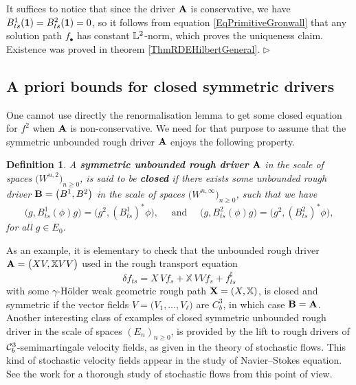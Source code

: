 \documentclass[11pt,a4paper]{amsart}
\newcommand{\bbX}{\mathbb{X}}
\renewcommand{\geq}{\geqslant}
\newcommand{\ssk}{\smallskip}
\newtheorem{defn}[thm]{ \hspace{-0.3cm} {\sc Definition}}%
\numberwithin{equation}{section} %
\newenvironment{Dem}{%
    \begin{list}{\hspace{0.5cm}{\sc Proof --}}{%
        \setlength{\topsep}{0pt}%
        \setlength{\leftmargin}{0pt}%
        \setlength{\rightmargin}{0pt}%
        \setlength{\listparindent}{0pt}%
        \setlength{\itemindent}{0pt}%
        \setlength{\parsep}{0pt}%
        \addtolength{\leftmargin}{20pt}%
        \addtolength{\rightmargin}{0pt}%
    } \item }{\hfill{\space $\rhd$}\end{list}\smallskip}
\begin{document}
\ssk

\begin{Dem}
It suffices to notice that since the driver $\bf A$ is conservative, we have $B^1_{ts}({\bf 1}) = B^2_{ts}({\bf 1}) = 0$, so it follows from equation \eqref{EqPrimitiveGronwall} that any solution path $f_\bullet$ has constant $\mathbb{L}^2$-norm, which proves the uniqueness claim. Existence was proved in theorem \ref{ThmRDEHilbertGeneral}.
\end{Dem}


\bigskip


\subsection{A priori bounds for closed symmetric drivers}
\label{SymmetricDrivers}

One cannot use directly the renormalisation lemma to get some closed equation for $f^2$ when $\bf A$ is non-conservative. We need for that purpose to assume that the symmetric unbounded rough driver $\bf A$ enjoys the following property.

\begin{defn}
A \emph{\textbf{symmetric unbounded rough driver}} $\bf A$ in the scale of spaces $\big(W^{n,2}\big)_{n\geq 0}$, is said to be \emph{\textbf{closed}} if there exists some unbounded rough driver ${\bf B}=\big(B^1,B^2\big)$ in the scale of spaces $\big(W^{n,\infty}\big)_{n\geq 0}$, such that we have  
$$
\Big(g,B^1_{ts}(\phi)g\Big) = \Big(g^2,(B^1_{ts})^*\phi\Big), \quad \textrm{  and  } \quad \Big(g,B^2_{ts}(\phi)g\Big) = \Big(g^2,(B^2_{ts})^*\phi\Big),
$$
for all $g\in E_0$. 
\end{defn}

As an example, it is elementary to check that the unbounded rough driver ${\bfA} = \big(XV,\bbX VV\big)$ used in the rough transport equation
\begin{equation*}
\delta f_{ts} = X\,Vf_s +  \bbX\,V V f_s + f^\sharp_{ts}
\end{equation*}
with some $\gamma$-H\"older weak geometric rough path ${\bfX} = (X,\bbX)$, is closed and symmetric if the vector fields $V = \big(V_1,\dots,V_\ell\big)$ are $C^3_b$, in which case $\bf B = \bf A$. Another interesting class of examples of closed symmetric unbounded rough driver in the scale of spaces $(E_n)_{n\geq 0}$, is provided by the lift to rough drivers of $\mathcal{C}^3_b$-semimartingale velocity fields, as given in the theory of stochastic flows. This kind of stochastic velocity fields appear in the study of Navier--Stokes equation. See the work \cite{BailleulRiedel} for a thorough study of stochastic flows from this point of view. 
\end{document}
